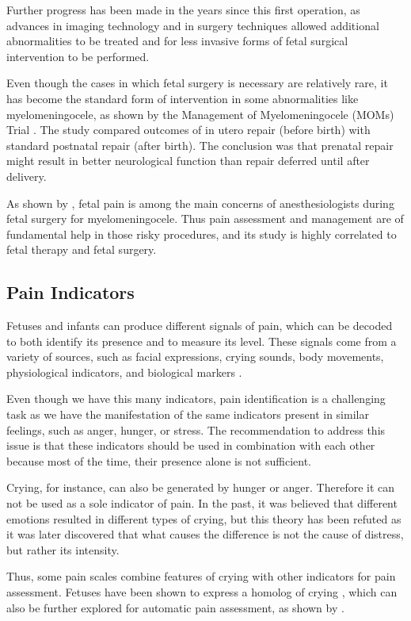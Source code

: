 Further progress has been made in the years since this first operation, as advances in imaging technology and in surgery techniques allowed additional abnormalities to be treated and for less invasive forms of fetal surgical intervention to be performed.

Even though the cases in which fetal surgery is necessary are relatively rare, it has become the standard form of intervention in some abnormalities like myelomeningocele, as shown by the Management of Myelomeningocele (MOMs) Trial \citep{Adzick2011}. The study compared outcomes of in utero repair (before birth) with standard postnatal repair (after birth). The conclusion was that prenatal repair might result in better neurological function than repair deferred until after delivery.

As shown by \cite{Devoto2017}, fetal pain is among the main concerns of anesthesiologists during fetal surgery for myelomeningocele. Thus pain assessment and management are of fundamental help in those risky procedures, and its study is highly correlated to fetal therapy and fetal surgery.

\subsection{Pain Indicators}

Fetuses and infants can produce different signals of pain, which can be decoded to both identify its presence and to measure its level. These signals come from a variety of sources, such as facial expressions, crying sounds, body movements, physiological indicators, and biological markers \citep{Bellieni2012}. 

Even though we have this many indicators, pain identification is a challenging task as we have the manifestation of the same indicators present in similar feelings, such as anger, hunger, or stress. The recommendation to address this issue is that these indicators should be used in combination with each other \citep{Bellieni2012} because most of the time, their presence alone is not sufficient. 

Crying, for instance, can also be generated by hunger or anger. Therefore it can not be used as a sole indicator of pain. In the past, it was believed that different emotions resulted in different types of crying, but this theory has been refuted as it was later discovered that what causes the difference is not the cause of distress, but rather its intensity. 

Thus, some pain scales combine features of crying with other indicators for pain assessment. Fetuses have been shown to express a homolog of crying \citep{Gingras2005}, which can also be further explored for automatic pain assessment, as shown by \cite{abs-1909-02543}. 

